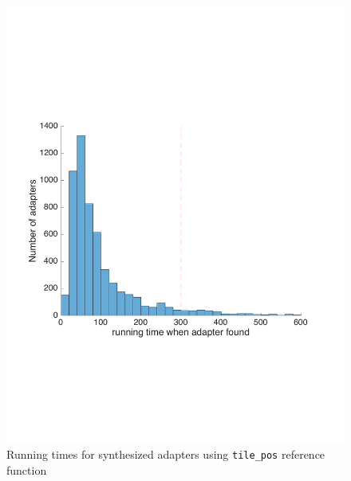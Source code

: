 \begin{figure}
    \centering
    \includegraphics[width=\widthfactor\textwidth]{chapters/adapter_synthesis/figures/tilepos_hist}
    \caption{Running times for synthesized adapters using {\tt tile\_pos} reference function}
    \label{fig:tilepos_hist}
\end{figure}
%
